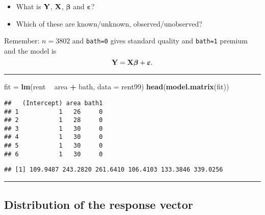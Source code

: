 \documentclass[]{article}
\newenvironment{Shaded}{\begin{snugshade}}{\end{snugshade}}
\newcommand{\DataTypeTok}[1]{\textcolor[rgb]{0.13,0.29,0.53}{#1}}
\newcommand{\KeywordTok}[1]{\textcolor[rgb]{0.13,0.29,0.53}{\textbf{#1}}}
\newcommand{\NormalTok}[1]{#1}
\newcommand{\OperatorTok}[1]{\textcolor[rgb]{0.81,0.36,0.00}{\textbf{#1}}}
\newcommand{\StringTok}[1]{\textcolor[rgb]{0.31,0.60,0.02}{#1}}
\providecommand{\tightlist}{%
  \setlength{\itemsep}{0pt}\setlength{\parskip}{0pt}}
\begin{document}
\begin{itemize}
\tightlist
\item
  What is \({\bf Y}\), \({\bf X}\), \(\boldsymbol{\beta}\) and
  \(\boldsymbol{\varepsilon}\)?
\item
  Which of these are known/unknown, observed/unobserved?
\end{itemize}

Remember: \(n=3802\) and \texttt{bath=0} gives standard quality and
\texttt{bath=1} premium and the model is
\[{\bf Y=X \boldsymbol\beta}+{\boldsymbol \varepsilon}.\]

\begin{center}\rule{0.5\linewidth}{\linethickness}\end{center}

\small

\begin{Shaded}
\begin{Highlighting}[]
\NormalTok{fit =}\StringTok{ }\KeywordTok{lm}\NormalTok{(rent }\OperatorTok{~}\StringTok{ }\NormalTok{area }\OperatorTok{+}\StringTok{ }\NormalTok{bath, }\DataTypeTok{data =}\NormalTok{ rent99)}
\KeywordTok{head}\NormalTok{(}\KeywordTok{model.matrix}\NormalTok{(fit))}
\end{Highlighting}
\end{Shaded}

\begin{verbatim}
##   (Intercept) area bath1
## 1           1   26     0
## 2           1   28     0
## 3           1   30     0
## 4           1   30     0
## 5           1   30     0
## 6           1   30     0
\end{verbatim}

\begin{Shaded}
\end{Shaded}

\begin{verbatim}
## [1] 109.9487 243.2820 261.6410 106.4103 133.3846 339.0256
\end{verbatim}

\normalsize

\begin{center}\rule{0.5\linewidth}{\linethickness}\end{center}

\hypertarget{distribution-of-the-response-vector}{%
\subsection{Distribution of the response
vector}\label{distribution-of-the-response-vector}}
\end{document}
